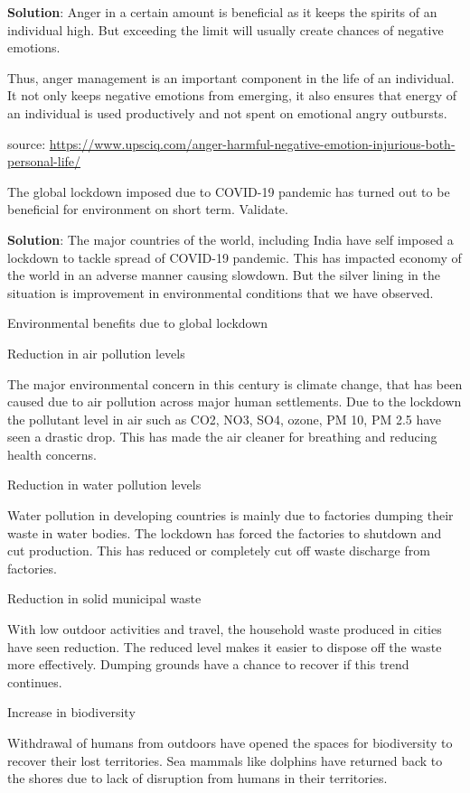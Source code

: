 \documentclass[
  openany]{book}
\newcommand{\question}{\item}
\newenvironment{solution}{ {\bfseries Solution}:}{}
\begin{document}
\begin{questions}
\begin{solution}
Anger in a certain amount is beneficial as it keeps the spirits of an individual high. But exceeding the limit will usually create chances of negative emotions.

Thus, anger management is an important component in the life of an individual. It not only keeps negative emotions from emerging, it also ensures that energy of an individual is used productively and  not spent on emotional angry outbursts.

source: \url{https://www.upsciq.com/anger-harmful-negative-emotion-injurious-both-personal-life/}
\end{solution}

\question The global lockdown imposed due to COVID-19 pandemic has turned out to be beneficial for environment on short term. Validate.

\begin{solution}
The major countries of the world, including India have self imposed a lockdown to tackle spread of COVID-19 pandemic. This has impacted economy of the world in an adverse manner causing slowdown. But the silver lining in the situation is improvement in environmental conditions that we have observed.

Environmental benefits due to global lockdown

Reduction in air pollution levels

The major environmental concern in this century is climate change, that has been caused due to air pollution across major human settlements. Due to the lockdown the pollutant level in air such as CO2, NO3, SO4, ozone, PM 10, PM 2.5 have seen a drastic drop. This has made the air cleaner for breathing and reducing health concerns.

Reduction in water pollution levels

Water pollution in developing countries is mainly due to factories dumping their waste in water bodies. The lockdown has forced the factories to shutdown and cut production. This has reduced or completely cut off waste discharge from factories.

Reduction in solid municipal waste

With low outdoor activities and travel, the household waste produced in cities have seen reduction. The reduced level makes it easier to dispose off the waste more effectively. Dumping grounds have a chance to recover if this trend continues.

Increase in biodiversity

Withdrawal of humans from outdoors have opened the spaces for biodiversity to recover their lost territories. Sea mammals like dolphins have returned back to the shores due to lack of disruption from humans in their territories.


\end{solution}
\end{questions}
\end{document}
